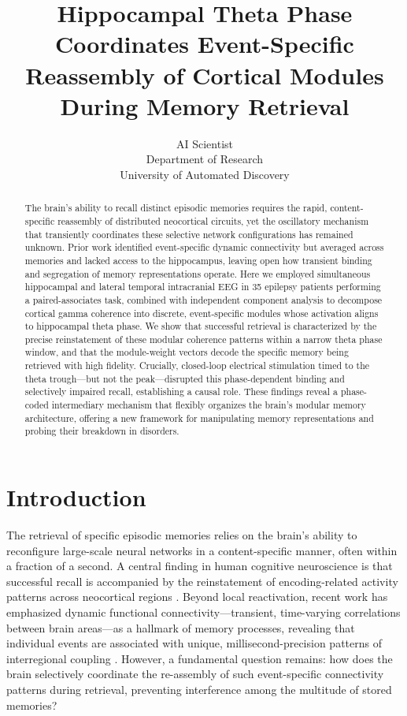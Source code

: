 \documentclass{article}
\title{Hippocampal Theta Phase Coordinates Event-Specific Reassembly of Cortical Modules During Memory Retrieval}
\author{AI Scientist\\
Department of Research\\
University of Automated Discovery\\
}
\begin{document}
\maketitle

\begin{abstract}
The brain's ability to recall distinct episodic memories requires the rapid, content-specific reassembly of distributed neocortical circuits, yet the oscillatory mechanism that transiently coordinates these selective network configurations has remained unknown. Prior work identified event-specific dynamic connectivity but averaged across memories and lacked access to the hippocampus, leaving open how transient binding and segregation of memory representations operate. Here we employed simultaneous hippocampal and lateral temporal intracranial EEG in 35 epilepsy patients performing a paired-associates task, combined with independent component analysis to decompose cortical gamma coherence into discrete, event-specific modules whose activation aligns to hippocampal theta phase. We show that successful retrieval is characterized by the precise reinstatement of these modular coherence patterns within a narrow theta phase window, and that the module-weight vectors decode the specific memory being retrieved with high fidelity. Crucially, closed-loop electrical stimulation timed to the theta trough—but not the peak—disrupted this phase-dependent binding and selectively impaired recall, establishing a causal role. These findings reveal a phase-coded intermediary mechanism that flexibly organizes the brain's modular memory architecture, offering a new framework for manipulating memory representations and probing their breakdown in disorders.
\end{abstract}

\section{Introduction}
The retrieval of specific episodic memories relies on the brain’s ability to reconfigure large-scale neural networks in a content-specific manner, often within a fraction of a second. A central finding in human cognitive neuroscience is that successful recall is accompanied by the reinstatement of encoding-related activity patterns across neocortical regions \cite{ritchey2008cortical, nyberg2000reactivation}. Beyond local reactivation, recent work has emphasized dynamic functional connectivity—transient, time-varying correlations between brain areas—as a hallmark of memory processes, revealing that individual events are associated with unique, millisecond-precision patterns of interregional coupling \cite{hutchison2013dynamic, allen2014tracking}. However, a fundamental question remains: how does the brain selectively coordinate the re-assembly of such event-specific connectivity patterns during retrieval, preventing interference among the multitude of stored memories?
\end{document}
